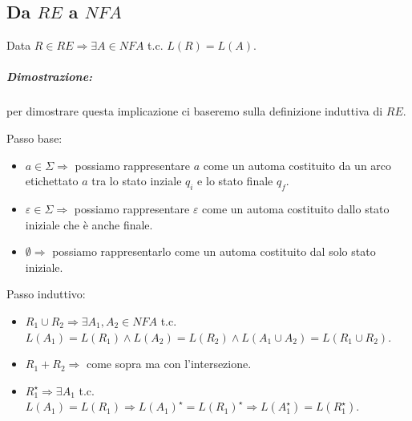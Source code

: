 \subsection{Da $RE$ a $NFA$}
Data $R \in RE \Rightarrow \exists A \in NFA$ t.c. $L(R) = L(A)$.
\subparagraph{Dimostrazione:} per dimostrare questa implicazione ci baseremo sulla definizione induttiva di $RE$.
\begin{description}
 	\item Passo base:
 		\begin{itemize}
 			\item $a \in \Sigma \Rightarrow$ possiamo rappresentare $a$ come un automa costituito da un arco etichettato $a$ tra lo stato inziale $q_i$ e lo stato finale $q_f$.
 			\item $\varepsilon \in \Sigma \Rightarrow$ possiamo rappresentare $\varepsilon$ come un automa costituito dallo stato iniziale che \`e anche finale.
 			\item  $\emptyset \Rightarrow$ possiamo rappresentarlo come un automa costituito dal solo stato iniziale.
 		\end{itemize}
 	\item Passo induttivo:
 		\begin{itemize}
 			\item $R_1 \cup R_2 \Rightarrow \exists A_1 , A_2 \in NFA$ t.c. $L(A_1) = L(R_1) \land L(A_2) = L(R_2) \land L(A_1 \cup A_2 ) = L(R_1 \cup R_2 )$.
 			\item $R_1 + R_2 \Rightarrow$ come sopra ma con l'intersezione.
 			\item  $R_1^{\star} \Rightarrow \exists A_1$ t.c. $L(A_1) = L(R_1) \Rightarrow L(A_1)^{\star} = L(R_1)^{\star} \Rightarrow L(A_1^{\star}) = L(R_1^{\star})$.
 		\end{itemize}
\end{description}

